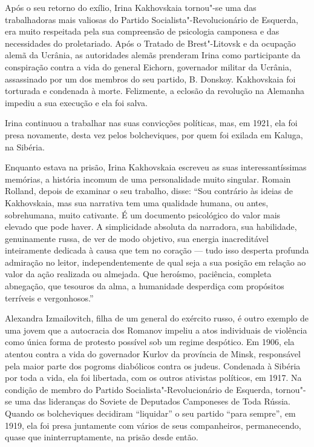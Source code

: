 Após o seu retorno do exílio, Irina Kakhovskaia tornou"-se uma das
trabalhadoras mais valiosas do Partido Socialista"-Revolucionário de
Esquerda, era muito respeitada pela sua compreensão de psicologia
camponesa e das necessidades do proletariado. Após o Tratado de
Brest"-Litovsk e da ocupação alemã da Ucrânia, as autoridades alemãs
prenderam Irina como participante da conspiração contra a vida do
general Eichorn, governador militar da Ucrânia, assassinado por um
dos membros do seu partido, B. Donskoy. Kakhovskaia foi torturada e
condenada à morte. Felizmente, a eclosão da revolução na Alemanha
impediu a sua execução e ela foi salva.

Irina continuou a trabalhar nas suas convicções políticas, mas, em 1921,
ela foi presa novamente, desta vez pelos bolcheviques, por quem foi
exilada em Kaluga, na Sibéria.

Enquanto estava na prisão, Irina Kakhovskaia escreveu as suas
interessantíssimas memórias, a história incomum de uma personalidade
muito singular. Romain Rolland, depois de examinar o seu trabalho,
disse: ``Sou contrário às ideias de Kakhovskaia, mas sua narrativa tem
uma qualidade humana, ou antes, sobrehumana, muito cativante. É um
documento psicológico do valor mais elevado que pode haver. A
simplicidade absoluta da narradora, sua habilidade, genuinamente russa,
de ver de modo objetivo, sua energia inacreditável inteiramente dedicada
à causa que tem no coração --- tudo isso desperta profunda admiração no
leitor, independentemente de qual seja a sua posição em relação ao valor
da ação realizada ou almejada. Que heroísmo, paciência, completa
abnegação, que tesouros da alma, a humanidade desperdiça com propósitos
terríveis e vergonhosos.''

Alexandra Izmailovitch, filha de um general do exército russo, é outro
exemplo de uma jovem que a autocracia dos Romanov impeliu a atos
individuais de violência como única forma de protesto possível sob um
regime despótico. Em 1906, ela atentou contra a vida do governador
Kurlov da província de Minsk, responsável pela maior parte dos pogroms
diabólicos contra os judeus. Condenada à Sibéria por toda a vida, ela
foi libertada, com os outros ativistas políticos, em 1917. Na condição de
membro do Partido Socialista"-Revolucionário de Esquerda, tornou"-se uma
das lideranças do Soviete de Deputados Camponeses de Toda Rússia.
Quando os bolcheviques decidiram ``liquidar'' o seu partido ``para
sempre'', em 1919, ela foi presa juntamente com vários de seus
companheiros, permanecendo, quase que ininterruptamente, na prisão desde
então.

